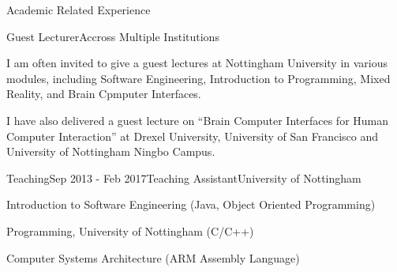 \documentclass{resume} %
\begin{document}
\begin{rSection}{Academic Related Experience}
	\begin{rSubsection}{Guest Lecturer}{Accross Multiple Institutions}{}{}
    	\item I am often invited to give a guest lectures at Nottingham University in various modules, including Software Engineering, Introduction to Programming, Mixed Reality, and Brain Cpmputer Interfaces.
    	\item I have also delivered a guest lecture on ``Brain Computer Interfaces for Human Computer Interaction'' at Drexel University, University of San Francisco and University of Nottingham Ningbo Campus.
    \end{rSubsection}
\vspace{-1 mm}
    \begin{rSubsection}{Teaching}{Sep 2013 - Feb 2017}{Teaching Assistant}{University of Nottingham}
        \item Introduction to Software Engineering (Java, Object Oriented Programming) 
        \item Programming, University of Nottingham (C/C++)
        \item Computer Systems Architecture (ARM Assembly Language)


\end{rSubsection}
\end{rSection}
\end{document}
